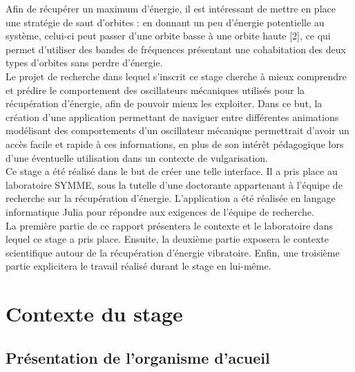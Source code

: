 \documentclass[a4paper, french, 12pt, titlepage]{article}
\begin{document}
Afin de récupérer un maximum d'énergie, il est intéressant de mettre en place une stratégie de saut d'orbites : en donnant un peu d'énergie potentielle au système, celui-ci peut passer d'une orbite basse à une orbite haute [2], ce qui permet d'utiliser des bandes de fréquences présentant une cohabitation des deux types d'orbites sans perdre d'énergie. \\

Le projet de recherche dans lequel s'inscrit ce stage cherche à mieux comprendre et prédire le comportement des oscillateurs mécaniques utilisés pour la récupération d'énergie, afin de pouvoir mieux les exploiter. 
Dans ce but, la création d'une application permettant de naviguer entre différentes animations modélisant des comportements d'un oscillateur mécanique permettrait d'avoir un accès facile et rapide à ces informations, en plus de son intérêt pédagogique lors d'une éventuelle utilisation dans un contexte de vulgarisation. \\

Ce stage a été réalisé dans le but de créer une telle interface. 
Il a pris place au laboratoire SYMME, sous la tutelle d'une doctorante appartenant à l'équipe de recherche sur la récupération d'énergie. 
L'application a été réalisée en langage informatique Julia pour répondre aux exigences de l'équipe de recherche. \\

La première partie de ce rapport présentera le contexte et le laboratoire dans lequel ce stage a pris place.
 Ensuite, la deuxième partie exposera le contexte scientifique autour de la récupération d'énergie vibratoire.
  Enfin, une troisième partie explicitera le travail réalisé durant le stage en lui-même.
   \\ 

\newpage 

\section{Contexte du stage}

\subsection{Présentation de l'organisme d'acueil}
\end{document}
